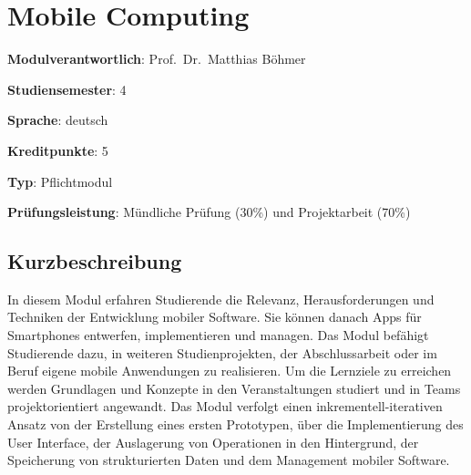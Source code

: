 \hypertarget{mobile-computingpathlabelmi-2017modulbeschreibungen-bachelorba_mobile-computing}{%
\chapter{Mobile
Computing\label{/mi-2017/modulbeschreibungen-bachelor/BA_Mobile-Computing}}\label{mobile-computingpathlabelmi-2017modulbeschreibungen-bachelorba_mobile-computing}}

\begin{modulHead}
\textbf{Modulverantwortlich}: Prof.~Dr.~Matthias
Böhmer
\end{modulHead}
\begin{modulHead}
\textbf{Studiensemester}:
4
\end{modulHead}
\begin{modulHead}
\textbf{Sprache}:
deutsch
\end{modulHead}
\begin{modulHead}
\textbf{Kreditpunkte}:
5
\end{modulHead}
\begin{modulHead}
\textbf{Typ}:
Pflichtmodul
\end{modulHead}
\begin{modulHead}
\textbf{Prüfungsleistung}:
Mündliche Prüfung (30\%) und Projektarbeit (70\%)
\end{modulHead}


\hypertarget{kurzbeschreibungpathlabelmi-2017modulbeschreibungen-bachelorba_mobile-computing}{%
\section*{Kurzbeschreibung\label{/mi-2017/modulbeschreibungen-bachelor/BA_Mobile-Computing}}\label{kurzbeschreibungpathlabelmi-2017modulbeschreibungen-bachelorba_mobile-computing}}

In diesem Modul erfahren Studierende die Relevanz, Herausforderungen und
Techniken der Entwicklung mobiler Software. Sie können danach Apps für
Smartphones entwerfen, implementieren und managen. Das Modul befähigt
Studierende dazu, in weiteren Studienprojekten, der Abschlussarbeit oder
im Beruf eigene mobile Anwendungen zu realisieren. Um die Lernziele zu
erreichen werden Grundlagen und Konzepte in den Veranstaltungen studiert
und in Teams projektorientiert angewandt. Das Modul verfolgt einen
inkrementell-iterativen Ansatz von der Erstellung eines ersten
Prototypen, über die Implementierung des User Interface, der Auslagerung
von Operationen in den Hintergrund, der Speicherung von strukturierten
Daten und dem Management mobiler Software.

